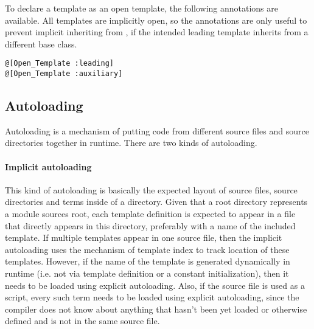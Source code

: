 To declare a template as an open template, the following annotations are available. All templates are implicitly open, so the annotations are only useful to prevent implicit inheriting from , if the intended leading template inherits from a different base class. 
\begin{lstlisting}
@[Open_Template :leading]
@[Open_Template :auxiliary]
\end{lstlisting}






\subsection{Autoloading}
\label{sec:autoloading}

Autoloading is a mechanism of putting code from different source files and source directories together in runtime. There are two kinds of autoloading.

\paragraph{Implicit autoloading}
This kind of autoloading is basically the expected layout of source files, source directories and terms inside of a directory. Given that a root directory represents a module sources root, each template definition is expected to appear in a file that directly appears in this directory, preferably with a name of the included template. If multiple templates appear in one source file, then the implicit autoloading uses the mechanism of template index to track location of these templates. However, if the name of the template is generated dynamically in runtime (i.e. not via template definition or a constant initialization), then it needs to be loaded using explicit autoloading. Also, if the source file is used as a script, every such term needs to be loaded using explicit autoloading, since the compiler does not know about anything that hasn't been yet loaded or otherwise defined and is not in the same source file. 

